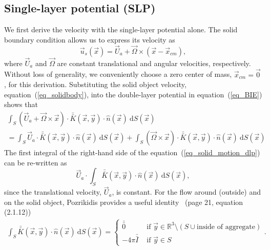 \subsection{Single-layer potential (SLP)}
We first derive the velocity with the single-layer potential alone.
The solid boundary condition allows us to express its velocity as 
\begin{equation}
	\vec{u}_s \left( \vec{x} \right) 
	= \vec{U}_a + \vec{\Omega} \times \left( \vec{x} - \vec{x}_{cm} \right),
	\label{eq_solidbody}
\end{equation}
where $\vec{U}_a$ and $\vec{\Omega}$ are constant translational and angular velocities, respectively. Without loss of generality, we conveniently choose a zero center of mass, $\vec{x}_{cm} = \vec{0}$, for this derivation.
Substituting the solid object velocity, equation~(\ref{eq_solidbody}), into the double-layer potential in equation~(\ref{eq_BIE}) shows that 
\begin{align}
	\int_S
	\left( \vec{U}_a + \vec{\Omega} \times \vec{x} \right)
	 \cdot  \bar{\bar{K}}(\vec{x},\vec{y})  
	\cdot \hat{n} ( \vec{x})
	\ \text{d}S(\vec{x})
    \nonumber \\
	= 
	\int_S
	\vec{U}_a
	 \cdot  \bar{\bar{K}}(\vec{x},\vec{y})  
	\cdot \hat{n} ( \vec{x})
	\ \text{d}S(\vec{x})
     + 	
	\int_S
	\left(  \vec{\Omega} \times \vec{x} \right)
	 \cdot  \bar{\bar{K}}(\vec{x},\vec{y})  
	\cdot \hat{n} ( \vec{x})
	\ \text{d}S(\vec{x})
	\label{eq_solid_motion_dlp}
\end{align}
The first integral of the right-hand side of the equation~(\ref{eq_solid_motion_dlp}) can be re-written as 
\begin{equation}
	\vec{U}_a \cdot
	\int_S
	  \bar{\bar{K}}(\vec{x},\vec{y})  
	\cdot \hat{n} ( \vec{x})
	\ \text{d}S(\vec{x}),
	\label{eq_solid_motion_dlp_Ua}
\end{equation}
since the translational velocity, $\vec{U}_a$, is constant. 
For the flow around (outside) and on the solid object, Pozrikidis provides a useful identity~\cite{pozrikidis_boundary_1992} (page 21, equation (2.1.12))
\begin{align}
	\int_S  \bar{\bar{K}}(\vec{x},\vec{y}) \cdot \hat{n} ( \vec{x})
	\ \text{d}S(\vec{x})
	=
	 \begin{cases}
	 \bar{\bar{0}} & \text{ if } \vec{y} \in \mathbb{R}^3  \setminus  \left( S \cup {\text{inside of aggregate}}\right) 	\\ 
	 - 4\pi \bar{\bar{I}} & \text{ if } \vec{y} \in S 
	 \end{cases}.
	\label{eq_dlp_identity1}
\end{align}
